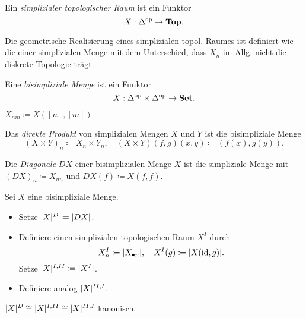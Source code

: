 \documentclass{cheat-sheet}
\begin{document}

\begin{defn}
  Ein \emph{simplizialer topologischer Raum} ist ein Funktor
  \[ X : \Delta^{\mathrm{op}} \to \mathbf{Top}. \]
\end{defn}

\begin{bem}
  Die geometrische Realisierung eines simplizialen topol. Raumes ist definiert wie die einer simplizialen Menge mit dem Unterschied, dass $X_n$ im Allg. nicht die diskrete Topologie trägt.
\end{bem}

\begin{defn}
  Eine \emph{bisimpliziale Menge} ist ein Funktor
  \[ X : \Delta^{\mathrm{op}} \times \Delta^{\mathrm{op}} \to \mathbf{Set}. \]
\end{defn}

\begin{nota}
  $X_{nm} \coloneqq X([n],[m])$
\end{nota}

\begin{bsp}
  Das \emph{direkte Produkt} von simplizialen Mengen $X$ und $Y$ ist die bisimpliziale Menge
  \[
    (X \times Y)_n \coloneqq X_n \times Y_n, \quad
    (X \times Y)(f, g)(x, y) \coloneqq (f(x), g(y)).
  \]
\end{bsp}

\begin{defn}
  Die \emph{Diagonale} $DX$ einer bisimplizialen Menge $X$ ist die simpliziale Menge mit
  $(DX)_n \coloneqq X_{nn}$ und $DX(f) \coloneqq X(f, f)$.
\end{defn}

\begin{defn}
  Sei $X$ eine bisimpliziale Menge.
  \begin{itemize}
    \item Setze $\lvert X\rvert^D \coloneqq \lvert DX\rvert$.
    \item Definiere einen simplizialen topologischen Raum $X^I$ durch
    \[ X^I_n \coloneqq \lvert X_{\bullet n}\rvert, \quad X^I(g) \coloneqq \lvert X(\operatorname{id}, g)\rvert. \]
    Setze $\lvert X\rvert^{I,II} \coloneqq \lvert X^I\rvert$.
    \item Definiere analog $\lvert X\rvert^{II,I}$.
  \end{itemize}
\end{defn}

\begin{satz}
  $\lvert X\rvert^D \cong \lvert X\rvert^{I,II} \cong \lvert X\rvert^{II,I}$ kanonisch.
\end{satz}
\end{document}
